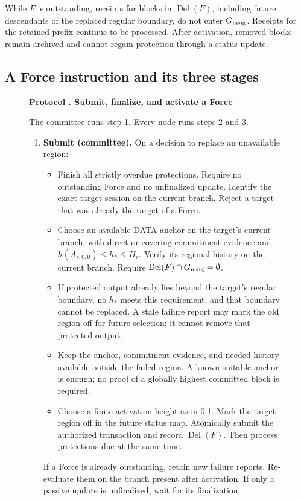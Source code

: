 \documentclass[11pt,a4paper]{article}
\newcommand{\Del}{\operatorname{Del}}
\newcounter{protocol}
\newenvironment{protocol}[2]{\begin{figure}[htbp]\refstepcounter{protocol}\label{#1}
\begin{mdframed}[linewidth=.6pt,skipabove=0pt,skipbelow=0pt,
innertopmargin=7pt,innerbottommargin=7pt]\small
\textbf{Protocol \theprotocol. #2}\par\smallskip}{\end{mdframed}\end{figure}}
\begin{document}
While $F$ is outstanding, receipts for blocks in $\Del(F)$, including
future descendants of the replaced regular boundary, do not enter
$G_{\rm msig}$. Receipts for the retained prefix
continue to be processed. After activation, removed blocks remain
archived and cannot regain protection through a status update.

\subsection{A Force instruction and its three stages}
\label{sec:force-stages}

\begin{protocol}{alg:force}{Submit, finalize, and activate a Force}
The committee runs step 1. Every node runs steps 2 and 3.
\begin{enumerate}[label=\textbf{\arabic*)},itemsep=3pt]
\item \textbf{Submit (committee).} On a decision to replace an unavailable region:
\begin{itemize}
\item Finish all strictly overdue protections. Require no outstanding
Force and no unfinalized update. Identify the exact target
session on the current branch. Reject a target that was already
the target of a Force.
\item Choose an available DATA anchor on the target's current
branch, with direct or covering commitment evidence and
$h(A_{r,0,0})\le h_*\le H_r$. Verify
its regional history on the current branch. Require
$\Del(F)\cap G_{\rm msig}=\emptyset$.
\item If protected output already lies beyond the target's regular
boundary, no $h_*$ meets this requirement, and that boundary cannot be replaced. A stale failure report may
mark the old region off for future selection; it cannot remove that
protected output.
\item Keep the anchor, commitment evidence, and needed history available outside
the failed region. A known suitable anchor is enough; no proof of a
globally highest committed block is required.
\item Choose a finite activation height as in \cref{sec:force-stages}.
Mark the target region off in the future status map. Atomically
submit the authorized transaction and record $\Del(F)$. Then
process protections due at the same time.
\end{itemize}
If a Force is already outstanding, retain new failure reports. Re-evaluate
them on the branch present after activation. If only a passive update
is unfinalized, wait for its finalization.


\end{enumerate}
\end{protocol}
\end{document}
